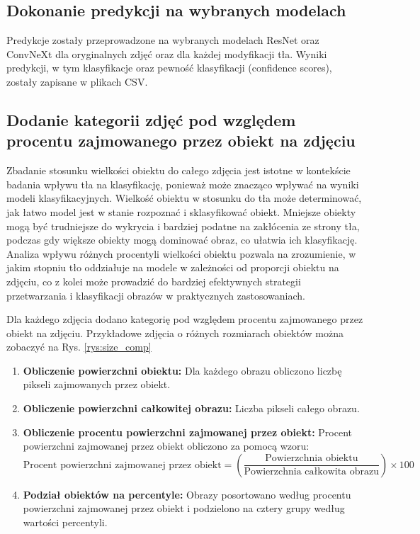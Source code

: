 \subsection*{Dokonanie predykcji na wybranych modelach}

Predykcje zostały przeprowadzone na wybranych modelach ResNet oraz ConvNeXt dla oryginalnych zdjęć oraz dla każdej 
modyfikacji tła. Wyniki predykcji, w tym klasyfikacje oraz pewność klasyfikacji (confidence scores), zostały zapisane w
plikach CSV.

\subsection*{Dodanie kategorii zdjęć pod względem procentu zajmowanego przez obiekt na zdjęciu}

Zbadanie stosunku wielkości obiektu do całego zdjęcia jest istotne w kontekście badania wpływu tła na klasyfikację, ponieważ 
może znacząco wpływać na wyniki modeli klasyfikacyjnych. Wielkość obiektu w stosunku do tła może determinować, jak łatwo model 
jest w stanie rozpoznać i sklasyfikować obiekt. Mniejsze obiekty mogą być trudniejsze do wykrycia i bardziej podatne na 
zakłócenia ze strony tła, podczas gdy większe obiekty mogą dominować obraz, co ułatwia ich klasyfikację. Analiza wpływu różnych 
procentyli wielkości obiektu pozwala na zrozumienie, w jakim stopniu tło oddziałuje na modele w zależności od proporcji obiektu 
na zdjęciu, co z kolei może prowadzić do bardziej efektywnych strategii przetwarzania i klasyfikacji obrazów w praktycznych 
zastosowaniach.

Dla każdego zdjęcia dodano kategorię pod względem procentu zajmowanego przez obiekt na zdjęciu. Przykładowe zdjęcia o różnych 
rozmiarach obiektów można zobaczyć na Rys. \ref*{rys:size_comp}

\begin{enumerate}
    \item \textbf{Obliczenie powierzchni obiektu:} Dla każdego obrazu obliczono liczbę pikseli zajmowanych przez obiekt.
    \item \textbf{Obliczenie powierzchni całkowitej obrazu:} Liczba pikseli całego obrazu.
    \item \textbf{Obliczenie procentu powierzchni zajmowanej przez obiekt:} Procent powierzchni zajmowanej przez obiekt obliczono za pomocą wzoru:
    \begin{equation}
    \text{Procent powierzchni zajmowanej przez obiekt} = \left( \frac{\text{Powierzchnia obiektu}}{\text{Powierzchnia całkowita obrazu}} \right) \times 100
    \end{equation}
    \item \textbf{Podział obiektów na percentyle:} Obrazy posortowano według procentu powierzchni zajmowanej przez obiekt i 
    podzielono na cztery grupy według wartości percentyli.
\end{enumerate}

